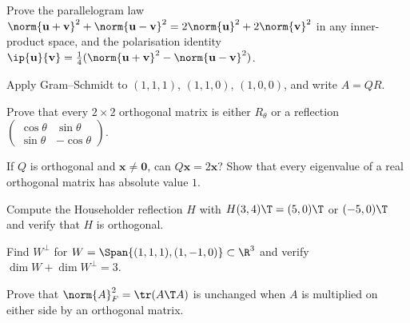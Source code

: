 \begin{exercise}
Prove the parallelogram law $\norm{\mathbf{u}+\mathbf{v}}^2+\norm{\mathbf{u}-\mathbf{v}}^2=2\norm{\mathbf{u}}^2+2\norm{\mathbf{v}}^2$ in any inner-product space, and the polarisation identity $\ip{\mathbf{u}}{\mathbf{v}}=\tfrac14(\norm{\mathbf{u}+\mathbf{v}}^2-\norm{\mathbf{u}-\mathbf{v}}^2)$.
\end{exercise}

\begin{exercise}
Apply Gram--Schmidt to $(1,1,1)$, $(1,1,0)$, $(1,0,0)$, and write $A=QR$.
\end{exercise}

\begin{exercise}
Prove that every $2\times2$ orthogonal matrix is either $R_\theta$ or a reflection $\begin{pmatrix}\cos\theta&\sin\theta\\\sin\theta&-\cos\theta\end{pmatrix}$.
\end{exercise}

\begin{exercise}
If $Q$ is orthogonal and $\mathbf{x}\ne\mathbf{0}$, can $Q\mathbf{x}=2\mathbf{x}$? Show that every eigenvalue of a real orthogonal matrix has absolute value $1$.
\end{exercise}

\begin{exercise}
Compute the Householder reflection $H$ with $H(3,4)\T=(5,0)\T$ or $(-5,0)\T$ and verify that $H$ is orthogonal.
\end{exercise}

\begin{exercise}
Find $W^\perp$ for $W=\Span\{(1,1,1),(1,-1,0)\}\subset\R^3$ and verify $\dim W+\dim W^\perp=3$.
\end{exercise}

\begin{exercise}
Prove that $\norm{A}_F^2=\tr(A\T A)$ is unchanged when $A$ is multiplied on either side by an orthogonal matrix.
\end{exercise}
